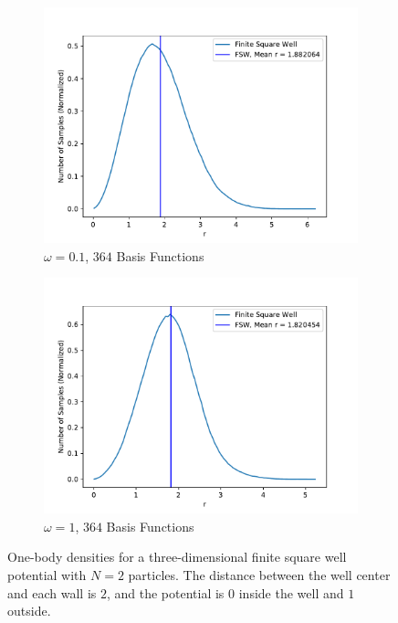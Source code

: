 \documentclass[../main.tex]{subfiles}
\begin{document}
\begin{figure}
\centering
\begin{subfigure}{0.48\textwidth}
\includegraphics[width=\linewidth]{figures/densityFSW/density_FSW_N2_Omega010_3d_BF364.pdf}
\caption{$\omega=0.1$, $364$ Basis Functions} \label{fig:FSW_N2_3d_a}
\end{subfigure}\hspace*{\fill}
\begin{subfigure}{0.48\textwidth}
\includegraphics[width=\linewidth]{figures/densityFSW/density_FSW_N2_Omega1_3d_BF364.pdf}
\caption{$\omega=1$, $364$ Basis Functions} \label{fig:FSW_N2_3d_b}
\end{subfigure}

\caption{One-body densities for a three-dimensional finite square well potential with $N=2$ particles. The distance between the well center and each wall is $2$, and the potential is $0$ inside the well and $1$ outside.} \label{fig:FSW_N2_3d}
\end{figure}
\end{document}
